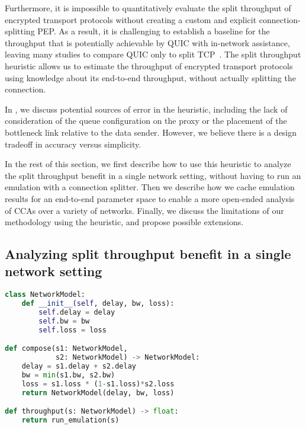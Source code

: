 Furthermore, it is impossible to quantitatively evaluate the split throughput
of encrypted transport protocols without creating a custom and explicit
connection-splitting PEP. As a result, it is challenging to establish a
baseline for the throughput that is potentially achievable by QUIC with
in-network assistance, leaving many studies to compare QUIC only to split TCP~\cite
{thomas2019google,border2020evaluating,yuan2024sidekick}. The split throughput
heuristic allows us to estimate the throughput of encrypted transport
protocols using knowledge about its end-to-end throughput, without
actually splitting the connection.

In , we discuss potential sources of error in the heuristic,
including the lack of consideration of the queue configuration on the proxy
or the placement of the bottleneck link relative to the data sender. However,
we believe there is a design tradeoff in accuracy versus simplicity.

In the rest of this section, we first describe how to use this heuristic to
analyze the split throughput benefit in a single network setting, without
having to run an emulation with a connection splitter. Then we describe how we
cache emulation results for an end-to-end parameter space to enable a more
open-ended analysis of CCAs over a variety of networks. Finally, we discuss the
limitations of our methodology using the heuristic, and propose possible
extensions.

\subsection{Analyzing split throughput benefit in a single network setting}
\label{sec:splitting:heuristic:example}

\begin{lstfloat}[t]
\begin{lstlisting}[language=Python]
class NetworkModel:
    def __init__(self, delay, bw, loss):
        self.delay = delay
        self.bw = bw
        self.loss = loss

def compose(s1: NetworkModel,
            s2: NetworkModel) -> NetworkModel:
    delay = s1.delay + s2.delay
    bw = min(s1.bw, s2.bw)
    loss = s1.loss * (1-s1.loss)*s2.loss
    return NetworkModel(delay, bw, loss)

def throughput(s: NetworkModel) -> float:
    return run_emulation(s)
\end{lstlisting}
\label{lst:multi-segment-network-model}
\end{lstfloat}


